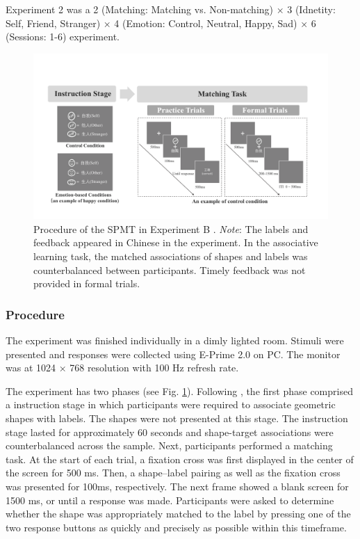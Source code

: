 \documentclass[sn-apa]{sn-jnl}%
\theoremstyle{thmstyleone}%
\theoremstyle{thmstyletwo}%
\theoremstyle{thmstylethree}%
\begin{document}
Experiment 2 was a 2 (Matching: Matching vs. Non-matching) × 3 (Idnetity: Self, Friend, Stranger) × 4 (Emotion: Control, Neutral, Happy, Sad) × 6 (Sessions: 1-6) experiment. 

\renewcommand{\thefigure}{S\arabic{figure}} %

\begin{figure}[!ht]
	\centering
	\includegraphics[width=1\textwidth]{./Figure/Fig1_Hu_pro.pdf}
	\caption[Procedure of the SPMT in Experiment B \parencite{hu2023data}]{	Procedure of the SPMT in Experiment B \parencite{hu2023data}. \textit{Note}: The labels and feedback appeared in Chinese in the experiment. In the associative learning task, the matched associations of shapes and labels was counterbalanced between participants. Timely feedback was not provided in formal trials.}
	\label{fig:Hu_SPMT_procedure}
\end{figure}

\subsubsection{Procedure}\label{subsec:procedure}

The experiment was finished individually in a dimly lighted room. Stimuli were presented and responses were collected using E-Prime 2.0 on PC. The monitor was at 1024 × 768 resolution with 100 Hz refresh rate.

The experiment has two phases (see Fig.  \ref{fig:Hu_SPMT_procedure}). Following \textcite{sui2012perceptual}, the first phase comprised a instruction stage in which participants were required to associate geometric shapes with labels. The shapes were not presented at this stage. The instruction stage lasted for approximately 60 seconds and shape-target associations were counterbalanced across the sample. Next, participants performed a matching task. At the start of each trial, a fixation cross was first displayed in the center of the screen for 500 ms. Then, a shape–label pairing as well as the fixation cross was presented for 100ms, respectively. The next frame showed a blank screen for 1500 ms, or until a response was made. Participants were asked to determine whether the shape was appropriately matched to the label by pressing one of the two response buttons as quickly and precisely as possible within this timeframe. 
\end{document}
